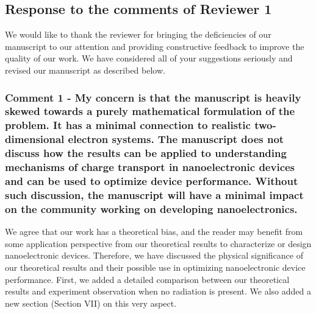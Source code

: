 \documentclass{article}
\begin{document}
\subsection*{Response to the comments of Reviewer 1}

We would like to thank the reviewer for bringing the deficiencies of our manuscript to our attention and providing constructive feedback to improve the quality of our work. We have considered all of your suggestions seriously and revised our manuscript as described below.

\subsubsection*{Comment 1 -
\color{RoyalBlue} My concern is that the manuscript is heavily skewed towards a purely mathematical formulation of the problem. It has a minimal connection to realistic two-dimensional electron systems. The manuscript does not discuss how the results can be applied to understanding mechanisms of charge transport in nanoelectronic devices and can be used to optimize device performance. Without such discussion, the manuscript will have a minimal impact on the community working on developing nanoelectronics.}

We agree that our work has a theoretical bias, and the reader may benefit from some application perspective from our theoretical results to characterize or design nanoelectronic devices. Therefore, we have discussed the physical significance of our theoretical results and their possible use in optimizing nanoelectronic device performance. First, we added a detailed comparison between our theoretical results and experiment observation when no radiation is present.  We also added a new section (Section VII) on this very aspect.
\end{document}
